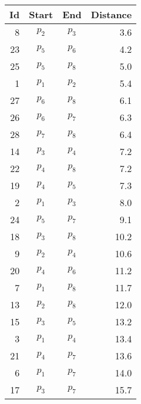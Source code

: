 \documentclass[
	final,
	a4paper,
	oneside,
	parskip=full,
	headings=standardclasses,
	headings=big,
	pointednumbers
]{scrartcl}
\begin{document}
    \begin{minipage}[t]{.5\linewidth}
        \begin{center}
            \begin{tabular}[t]{|r|c|c|r|}
                \hline
                \textbf{Id} & \textbf{Start} & \textbf{End} & \textbf{Distance} \\
                \hline
                8 & $p_{2}$ & $p_{3}$ & 3.6 \\
                23 & $p_{5}$ & $p_{6}$ & 4.2 \\
                25& $p_{5}$ & $p_{8}$ & 5.0 \\
                1 & $p_{1}$ & $p_{2}$ & 5.4 \\
                \rowcolor[HTML]{DDDDDD} 27 & $p_{6}$ & $p_{8}$ & 6.1 \\
                26 & $p_{6}$ & $p_{7}$ & 6.3 \\
                \rowcolor[HTML]{DDDDDD} 28 & $p_{7}$ & $p_{8}$ & 6.4 \\
                14 & $p_{3}$ & $p_{4}$ & 7.2 \\
                22 & $p_{4}$ & $p_{8}$ & 7.2 \\
                \rowcolor[HTML]{DDDDDD} 19 & $p_{4}$ & $p_{5}$ & 7.3 \\
                \rowcolor[HTML]{DDDDDD} 2 & $p_{1}$ & $p_{3}$ & 8.0 \\
                \rowcolor[HTML]{DDDDDD} 24 & $p_{5}$ & $p_{7}$ & 9.1 \\
                \rowcolor[HTML]{DDDDDD} 18 & $p_{3}$ & $p_{8}$ & 10.2 \\
                \rowcolor[HTML]{DDDDDD} 9 & $p_{2}$ & $p_{4}$ & 10.6 \\
                \rowcolor[HTML]{DDDDDD} 20 & $p_{4}$ & $p_{6}$ & 11.2 \\
                \rowcolor[HTML]{DDDDDD} 7 & $p_{1}$ & $p_{8}$ & 11.7 \\
                \rowcolor[HTML]{DDDDDD} 13 & $p_{2}$ & $p_{8}$ & 12.0 \\
                \rowcolor[HTML]{DDDDDD} 15 & $p_{3}$ & $p_{5}$ & 13.2 \\
                \rowcolor[HTML]{DDDDDD} 3 & $p_{1}$ & $p_{4}$ & 13.4 \\
                \rowcolor[HTML]{DDDDDD} 21 & $p_{4}$ & $p_{7}$ & 13.6 \\
                6 & $p_{1}$ & $p_{7}$ & 14.0 \\
                \rowcolor[HTML]{999999} 17 & $p_{3}$ & $p_{7}$ & 15.7 \\

\end{tabular}
\end{center}
\end{minipage}
\end{document}
